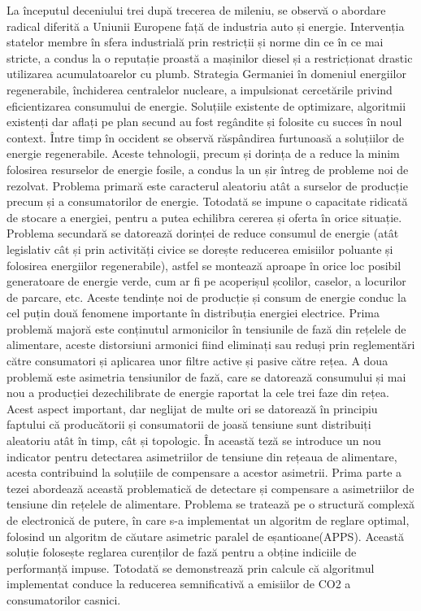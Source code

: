 La începutul deceniului trei după trecerea de mileniu, se observă o abordare radical diferită a Uniunii Europene față de industria auto și energie. Intervenția statelor membre în sfera industrială prin restricții și norme din ce în ce mai stricte, a condus la o reputație proastă a mașinilor diesel și a restricționat drastic utilizarea acumulatoarelor cu plumb. Strategia Germaniei în domeniul energiilor regenerabile, închiderea centralelor nucleare, a impulsionat cercetările privind eficientizarea consumului de energie.  Soluțiile existente de optimizare, algoritmii existenți dar aflați pe plan secund au fost regândite și folosite cu succes în noul context. Între timp în occident se observă răspândirea furtunoasă a soluțiilor de energie regenerabile. Aceste tehnologii, precum și dorința de a reduce la minim folosirea resurselor de energie fosile, a condus la un șir întreg de probleme noi de rezolvat. Problema primară este caracterul aleatoriu atât a surselor de producție precum și a consumatorilor de energie. Totodată se impune o capacitate ridicată de stocare a energiei, pentru a putea echilibra cererea și oferta în orice situație. Problema secundară se datorează dorinței de reduce consumul de energie (atât legislativ cât și prin activități civice se dorește reducerea emisiilor poluante și folosirea energiilor regenerabile), astfel se montează aproape în orice loc posibil generatoare de energie verde, cum ar fi pe acoperișul școlilor, caselor, a locurilor de parcare, etc. Aceste tendințe noi de producție și consum de energie conduc la cel puțin două fenomene importante în distribuția energiei electrice. Prima problemă majoră este conținutul armonicilor în tensiunile de fază din rețelele de alimentare, aceste distorsiuni armonici fiind eliminați sau reduși prin reglementări către consumatori și aplicarea unor filtre active și pasive către rețea. A doua problemă este asimetria tensiunilor de fază, care se datorează consumului și mai nou a producției dezechilibrate de energie raportat la cele trei faze din rețea. Acest aspect important, dar neglijat de multe ori se datorează în principiu faptului că producătorii și consumatorii de joasă tensiune sunt distribuiți aleatoriu atât în timp, cât și topologic. În această teză se introduce un nou indicator pentru detectarea asimetriilor de tensiune din rețeaua de alimentare, acesta contribuind la soluțiile de compensare a acestor asimetrii. Prima parte a tezei abordează această problematică de detectare și compensare a asimetriilor de tensiune din rețelele de alimentare. Problema se tratează pe o structură complexă de electronică de putere, în care s-a implementat un algoritm de reglare optimal, folosind un algoritm de căutare asimetric paralel de eșantioane(APPS). Această soluție folosește reglarea curenților de fază pentru a obține indiciile de performanță impuse. Totodată se demonstrează prin calcule că algoritmul implementat conduce la reducerea semnificativă a emisiilor de CO2 a consumatorilor casnici.
